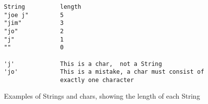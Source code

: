 




\begin {figure}


\begin{verbatim}
String          length
"joe j"         5
"jim"           3
"jo"            2
"j"             1
""              0

'j'             This is a char,  not a String
'jo'            This is a mistake, a char must consist of
                exactly one character
\end{verbatim}

\caption {Examples of Strings and chars, showing the
length of each String}
\label {fig:charVsString}

\end {figure}


